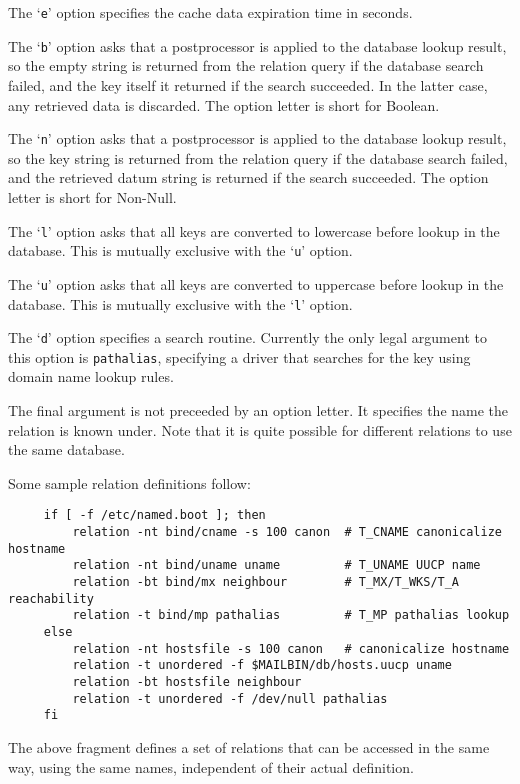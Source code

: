 The `{\tt e}' option specifies the cache data expiration time in seconds.

The `{\tt b}' option asks that a postprocessor is applied to the database 
lookup result, so the empty string is returned from the relation query if the
database search failed, and the key itself it returned if the search
succeeded.  In the latter case, any retrieved data is discarded.  The
option letter is short for Boolean.

The `{\tt n}' option asks that a postprocessor is applied to the database 
lookup result, so the key string is returned from the relation query if the
database search failed, and the retrieved datum string is returned if the
search succeeded.  The option letter is short for Non-Null.

The `{\tt l}' option asks that all keys are converted to lowercase before 
lookup in the database.  This is mutually exclusive with the `{\tt u}' 
option.

The `{\tt u}' option asks that all keys are converted to uppercase before 
lookup in the database.  This is mutually exclusive with the `{\tt l}' 
option.

The `{\tt d}' option specifies a search routine.  Currently the only legal
argument to this option is {\tt pathalias}, specifying a driver that searches
for the key using domain name lookup rules.

The final argument is not preceeded by an option letter.  It specifies the
name the relation is known under.  Note that it is quite possible for
different relations to use the same database.

Some sample relation definitions follow:

\begin{tscreen}
\begin{verbatim}
     if [ -f /etc/named.boot ]; then
         relation -nt bind/cname -s 100 canon  # T_CNAME canonicalize hostname
         relation -nt bind/uname uname         # T_UNAME UUCP name
         relation -bt bind/mx neighbour        # T_MX/T_WKS/T_A reachability
         relation -t bind/mp pathalias         # T_MP pathalias lookup
     else
         relation -nt hostsfile -s 100 canon   # canonicalize hostname
         relation -t unordered -f $MAILBIN/db/hosts.uucp uname
         relation -bt hostsfile neighbour
         relation -t unordered -f /dev/null pathalias
     fi
\end{verbatim}
\end{tscreen}


The above fragment defines a set of relations that can be accessed in the
same way, using the same names, independent of their actual definition.

